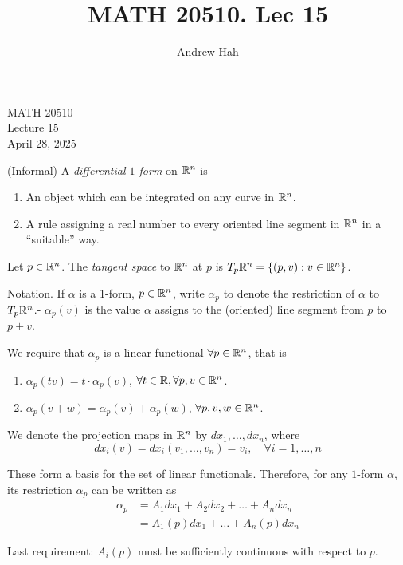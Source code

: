 \documentclass[11pt]{article}
\title{MATH 20510. Lec 15}
\author{Andrew Hah}
\begin{document}
\pagestyle{plain}
\begin{center}
{\Large MATH 20510} \\
{\Large Lecture 15} \\
\vspace{.2in}
April 28, 2025
\end{center}

\begin{definition} (Informal) A \emph{differential $1$-form} on $\mathbb{R}^n$ is \begin{enumerate}
  \item An object which can be integrated on any curve in $\mathbb{R}^n$.
  \item A rule assigning a real number to every oriented line segment in $\mathbb{R}^n$ in a ``suitable'' way.
  \end{enumerate}
\end{definition}

\begin{definition} Let $p \in \mathbb{R}^n$. The \emph{tangent space} to $\mathbb{R}^n$ at $p$ is $T_p \mathbb{R}^n = \{ (p, v) : v \in \mathbb{R}^n \}$.
\end{definition}

Notation. If $\alpha$ is a 1-form, $p \in \mathbb{R}^n$, write $\alpha_p$ to denote the restriction of $\alpha$ to $T_p \mathbb{R}^n$.- $\alpha_p(v)$ is the value $\alpha$ assigns to the (oriented) line segment from $p$ to $p + v$.

We require that $\alpha_p$ is a linear functional $\forall p \in \mathbb{R}^n$, that is \begin{enumerate}
\item $\alpha_p(tv) = t \cdot \alpha_p(v)$, $\forall t \in \mathbb{R}, \forall p, v \in \mathbb{R}^n$.
\item $\alpha_p(v + w) = \alpha_p(v) + \alpha_p(w)$, $\forall p, v, w \in \mathbb{R}^n$.
\end{enumerate}

We denote the projection maps in $\mathbb{R}^n$ by $dx_1, \dots, dx_n$, where $$dx_i(v) = dx_i(v_1, \dots, v_n) = v_i, \quad \forall i = 1, \dots, n$$

These form a basis for the set of linear functionals. Therefore, for any $1$-form $\alpha$, its restriction $\alpha_p$ can be written as \begin{align*} \alpha_p & = A_1dx_1 + A_2dx_2 + \dots + A_ndx_n \\ & = A_1(p) dx_1 + \dots + A_n(p)dx_n \end{align*}

Last requirement: $A_i(p)$ must be sufficiently continuous with respect to $p$.
\end{document}
